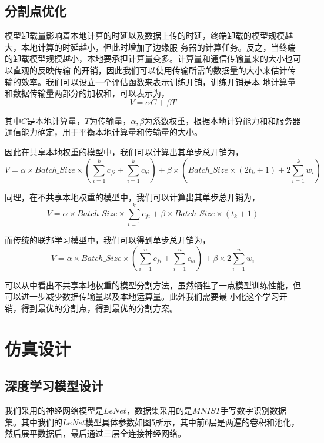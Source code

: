 \documentclass{article}
\begin{document}
\subsection{分割点优化}

模型卸载量影响着本地计算的时延以及数据上传的时延，终端卸载的模型规模越⼤，本地计算的时延越⼩，但此时增加了边缘服
务器的计算任务。反之，当终端的卸载模型规模越⼩，本地要承担计算量变多。计算量和通信传输量来的⼤⼩也可以直观的反映传输
的开销，因此我们可以使⽤传输所需的数据量的⼤⼩来估计传输的效率。我们可以设⽴⼀个评估函数来表示训练开销，训练开销是本
地计算量和数据传输量两部分的加权和，可以表示为，
\begin{equation}
    V=\alpha C+\beta T 
\end{equation}

其中$C$是本地计算量，$T$为传输量，$\alpha,\beta$为系数权重，根据本地计算能力和和服务器通信能力确定，⽤于平衡本地计算量和传输量的⼤⼩。

因此在共享本地权重的模型中，我们可以计算出其单步总开销为，
\begin{equation}
    V=\alpha \times Batch\_Size \times (\sum_{i=1}^k c_{fi}+\sum_{i=1}^k c_{bi})+\beta \times (Batch\_Size \times (2t_k+1)+2\sum_{i=1}^k w_i)
\end{equation}

同理，在不共享本地权重的模型中，我们可以计算出其单步总开销为，
\begin{equation}
    V=\alpha \times Batch\_Size \times \sum_{i=1}^k c_{fi}+\beta \times Batch\_Size \times (t_k+1)
\end{equation}


⽽传统的联邦学习模型中，我们可以得到单步总开销为，
\begin{equation}
    V=\alpha \times Batch\_Size \times (\sum_{i=1}^n c_{fi}+\sum_{i=1}^n c_{bi})+\beta \times 2\sum_{i=1}^n w_i
\end{equation}

可以从中看出不共享本地权重的模型分割⽅法，虽然牺牲了⼀点模型训练性能，但可以进⼀步减少数据传输量以及本地运算量。此外我们需要最
⼩化这个学习开销，得到最优的分割点，得到最优的分割⽅案。

\section{仿真设计}
\subsection{深度学习模型设计}
我们采⽤的神经⽹络模型是$LeNet$，数据集采⽤的是$MNIST$⼿写数字识别数据集。其中我们的$LeNet$模型具体参数如图5所示，其中前6层是两遍的卷积和池化，然后展平数据后，最后通过三层全连接神经网络。
\end{document}
